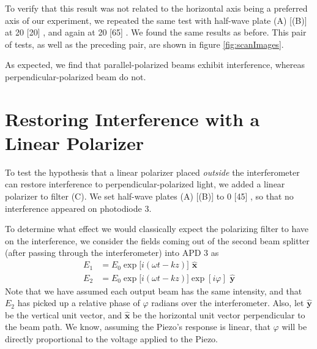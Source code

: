 \documentclass[letter]{article}
\newcommand{\BVEC}[1]{\hat{\mathbf{#1}}}
\begin{document}
To verify that this result was not related to the horizontal axis being a preferred axis of our experiment, we repeated the same test with half-wave plate (A) [(B)] at 20 [20] \unit{\deg}, and again at 20 [65] \unit{\deg}. We found the same results as before. This pair of tests, as well as the preceding pair, are shown in figure \ref{fig:scanImages}.

As expected, we find that parallel-polarized beams exhibit interference, whereas perpendicular-polarized beam do not.

\section{Restoring Interference with a Linear Polarizer}

To test the hypothesis that a linear polarizer placed \textit{outside} the interferometer can restore interference to perpendicular-polarized light, we added a linear polarizer to filter (C). We set half-wave plates (A) [(B)] to 0 [45] \unit{\deg}, so that no interference appeared on photodiode 3.

To determine what effect we would classically expect the polarizing filter to have on the interference, we consider the fields coming out of the second beam splitter (after passing through the interferometer) into APD 3 as
\begin{align}
E_1 &= E_0 \exp \big[ i (\omega t - kz) \big] \,\, \BVEC{x} \\
E_2 &= E_0 \exp \big[ i (\omega t - kz) \big] \exp[i\varphi] \,\, \BVEC{y}
\end{align}
Note that we have assumed each output beam has the same intensity, and that $E_2$ has picked up a relative phase of $\varphi$ radians over the interferometer. Also, let $\BVEC{y}$ be the vertical unit vector, and $\BVEC{x}$ be the horizontal unit vector perpendicular to the beam path. We know, assuming the Piezo's response is linear, that $\varphi$ will be directly proportional to the voltage applied to the Piezo.
\end{document}
